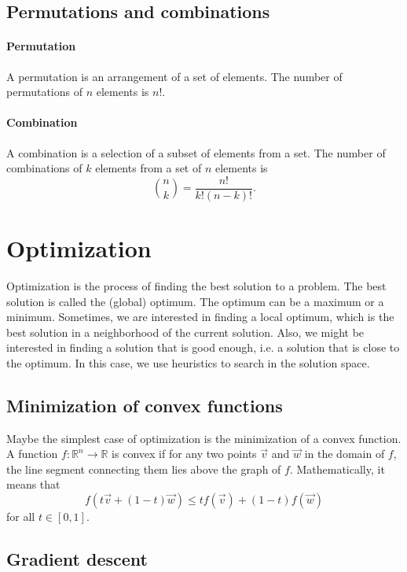 \subsection{Permutations and combinations}

\paragraph{Permutation}  A permutation is an arrangement of a set of elements.  The
number of permutations of $n$ elements is $n!$.

\paragraph{Combination}  A combination is a selection of a subset of elements from a
set.  The number of combinations of $k$ elements from a set of $n$ elements is
$$\binom{n}{k} = \frac{n!}{k!(n - k)!}\text{.}$$

\section{Optimization}

Optimization is the process of finding the best solution to a problem.  The best
solution is called the (global) optimum.  The optimum can be a maximum or a minimum.
Sometimes, we are interested in finding a local optimum, which is the best solution
in a neighborhood of the current solution.  Also, we might be interested in finding
a solution that is good enough, i.e. a solution that is close to the optimum.
In this case, we use heuristics to search in the solution space.

\subsection{Minimization of convex functions}

Maybe the simplest case of optimization is the minimization of a convex function.
A function $f : \mathbb{R}^n \rightarrow \mathbb{R}$ is convex if for any two points
$\vec{v}$ and $\vec{w}$ in the domain of $f$, the line segment connecting them lies
above the graph of $f$.  Mathematically, it means that
$$f(t\vec{v} + (1 - t) \vec{w}) \leq t f(\vec{v}) + (1 - t) f(\vec{w})$$ for all $t \in [0, 1]$.

\subsection{Gradient descent}

